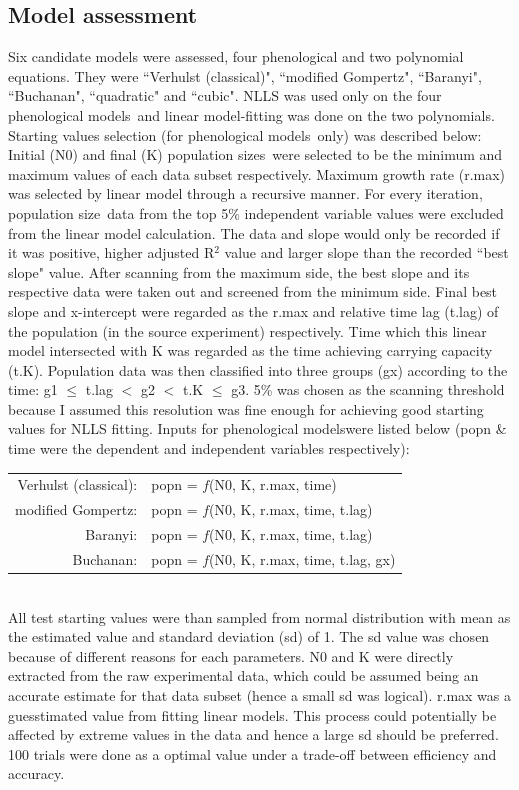 \documentclass[a4paper, 11pt]{article}
\newcommand{\pms}{phenological models}
\newcommand{\fve}{Verhulst (classical)}
\newcommand{\fgo}{modified Gompertz}
\newcommand{\fba}{Baranyi}
\newcommand{\fbu}{Buchanan}
\newcommand{\fqu}{quadratic}
\newcommand{\fcu}{cubic}
\newcommand{\pop}{population size}
\newcommand{\pps}{population sizes}
\begin{document}
	\subsection*{Model assessment}
	Six candidate models were assessed, four phenological and two polynomial equations.  They were ``\fve"\autocite{mckendrick1912xlv}, ``\fgo"\autocite{GIL200689}, ``\fba"\autocite{baranyi1993modeling}, ``\fbu"\autocite{buchanan1993differentiation}, ``\fqu" and ``\fcu". NLLS was used only on the four \pms\ and linear model-fitting was done on the two polynomials.  Starting values selection (for \pms\ only) was described below:\\
	Initial (N0) and final (K) \pps\ were selected to be the minimum and maximum values of each data subset respectively.  Maximum growth rate (r.max) was selected by linear model through a recursive manner.  For every iteration, \pop\ data from the top 5\% independent variable values were excluded from the linear model calculation.  The data and slope would only be recorded if it was positive, higher adjusted R$^{2}$ value and larger slope than the recorded ``best slope" value.  After scanning from the maximum side, the best slope and its respective data were taken out and screened from the minimum side.  Final best slope and x-intercept were regarded as the r.max and relative time lag (t.lag) of the population (in the source experiment) respectively.  Time which this linear model intersected with K was regarded as the time achieving carrying capacity (t.K).  Population data was then classified into three groups (gx) according to the time: g1 $\leq$ t.lag $<$ g2 $<$ t.K $\leq$ g3.  5\% was chosen as the scanning threshold because I assumed this resolution was fine enough for achieving good starting values for NLLS fitting.  Inputs for \pms were listed below (popn \& time were the dependent and independent variables respectively):\\
	\begin{tabular}{rl}
		\fve: & popn = $f$(N0, K, r.max, time)\\
		\fgo: & popn = $f$(N0, K, r.max, time, t.lag)\\
		\fba: & popn = $f$(N0, K, r.max, time, t.lag)\\
		\fbu: & popn = $f$(N0, K, r.max, time, t.lag, gx)
	\end{tabular}\\
	
	All test starting values were than sampled from normal distribution with mean as the estimated value and standard deviation (sd) of 1.  The sd value was chosen because of different reasons for each parameters.  N0 and K were directly extracted from the raw experimental data, which could be assumed being an accurate estimate for that data subset (hence a small sd was logical). r.max was a guesstimated value from fitting linear models.  This process could potentially be affected by extreme values in the data and hence a large sd should be preferred.  100 trials were done as a optimal value under a trade-off between efficiency and accuracy.\\
	
\end{document}
